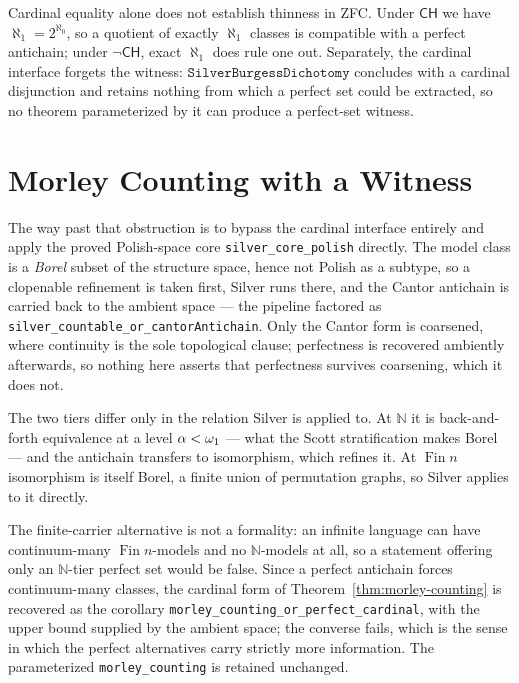 Cardinal equality alone does not establish thinness in ZFC.  Under $\mathsf{CH}$
we have $\aleph_1 = 2^{\aleph_0}$, so a quotient of exactly $\aleph_1$ classes is
compatible with a perfect antichain; under $\neg\mathsf{CH}$, exact $\aleph_1$
does rule one out.  Separately, the cardinal interface forgets the witness:
$\mathtt{SilverBurgessDichotomy}$ concludes with a cardinal disjunction and
retains nothing from which a perfect set could be extracted, so no theorem
parameterized by it can produce a perfect-set witness.

\section{Morley Counting with a Witness}

The way past that obstruction is to bypass the cardinal interface entirely and
apply the proved Polish-space core \texttt{silver\_core\_polish} directly.  The
model class is a \emph{Borel} subset of the structure space, hence not Polish as
a subtype, so a clopenable refinement is taken first, Silver runs there, and the
Cantor antichain is carried back to the ambient space --- the pipeline factored
as \texttt{silver\_countable\_or\_cantorAntichain}.  Only the Cantor form is
coarsened, where continuity is the sole topological clause; perfectness is
recovered ambiently afterwards, so nothing here asserts that perfectness
survives coarsening, which it does not.



The two tiers differ only in the relation Silver is applied to.  At $\mathbb{N}$
it is back-and-forth equivalence at a level $\alpha < \omega_1$ --- what the
Scott stratification makes Borel --- and the antichain transfers to isomorphism,
which refines it.  At $\operatorname{Fin} n$ isomorphism is itself Borel, a
finite union of permutation graphs, so Silver applies to it directly.


The finite-carrier alternative is not a formality: an infinite language can have
continuum-many $\operatorname{Fin} n$-models and no $\mathbb{N}$-models at all,
so a statement offering only an $\mathbb{N}$-tier perfect set would be false.
Since a perfect antichain forces continuum-many classes, the cardinal form of
Theorem~\ref{thm:morley-counting} is recovered as the corollary
\texttt{morley\_counting\_or\_perfect\_cardinal}, with the upper bound supplied
by the ambient space; the converse fails, which is the sense in which the
perfect alternatives carry strictly more information.  The parameterized
\texttt{morley\_counting} is retained unchanged.


